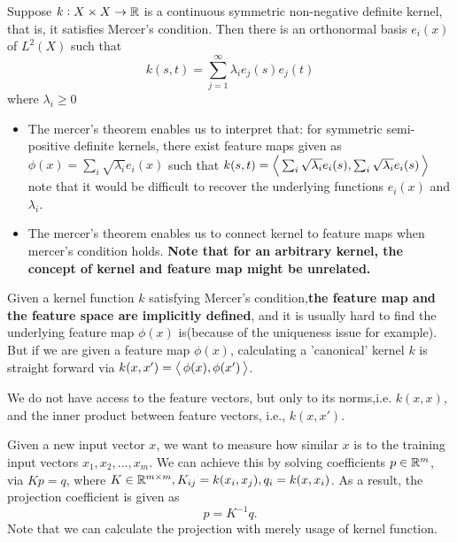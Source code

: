 \begin{refsection}
\begin{theorem}
	\cite{wiki:Mercer}\cite[64]{shawe2004kernel}
	Suppose $k:X\times X\to \mathbb{R}$ is a continuous symmetric non-negative definite kernel, that is, it satisfies Mercer's condition. Then there is an orthonormal basis $e_i(x)$ of $L^2(X)$ such that
	$$k(s,t) = \sum_{j=1}^\infty \lambda_i e_j(s)e_j(t)$$
	where $\lambda_i \geq 0$
\end{theorem}

\begin{remark}\hfill
	\begin{itemize}
		\item The mercer's theorem enables us to interpret that: for symmetric semi-positive definite kernels, there exist feature maps given as $\phi(x) =\sum_i \sqrt{\lambda_i}e_i(x) $ such that $k(s,t) = {\left< \, \sum_i \sqrt{\lambda_i}e_i(s),\sum_i \sqrt{\lambda_i}e_i(s) \, \right>}$
		note that it would be difficult to recover the underlying functions $e_i(x)$ and $\lambda_i$.
		\item The mercer's theorem enables us to connect kernel to feature maps when mercer's condition holds. \textbf{Note that for an arbitrary kernel, the concept of kernel and feature map might be unrelated.} 
	\end{itemize}
\end{remark}



\begin{remark}
	Given a kernel function $k$ satisfying Mercer's condition,\textbf{the feature map and the feature space are implicitly defined}, and it is usually hard to find the underlying feature map $\phi(x)$ is(because of the uniqueness issue for example).
	But if we are given a feature map $\phi(x)$, calculating a 'canonical' kernel $k$ is straight forward via $k(x,x')={\left< \, \phi(x),\phi(x') \, \right>}$.
\end{remark}


\begin{remark}
	We do not have access to the feature vectors, but only to its norms,i.e. $k(x,x)$, and the inner product between feature vectors, i.e., $k(x,x')$.
\end{remark}




\begin{remark}
	Given a new input vector $x$, we want to measure how similar $x$ is to the training input vectors $x_1,x_2,...,x_m$. We can achieve this by solving coefficients $p\in \mathbb{R}^m$, via $Kp = q$, where $K\in \mathbb{R}^{m\times m}, K_{ij} = k(x_i,x_j), q_i=k(x,x_i)$. As a result, the projection coefficient is given as $$p = K^{-1}q.$$
	Note that we can calculate the projection with merely usage of kernel function.
\end{remark}



\end{refsection}
